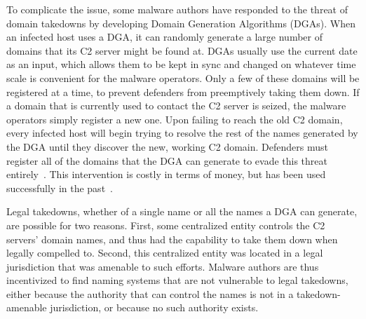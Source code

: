 To complicate the issue, some malware authors have responded to the threat of 
domain 
takedowns by developing Domain Generation Algorithms (DGAs). When an infected 
host uses a DGA, it can randomly generate a large number 
of domains that its C2 server might be found at. DGAs usually use the current 
date as an input, which allows them to be kept in sync and changed on whatever 
time scale is convenient for the malware operators. Only a few of these domains 
will be registered at a time, to prevent defenders from preemptively taking 
them down. If a  
domain that is currently used to contact the C2 server is seized, the malware 
operators simply register a new one. Upon failing to reach the old C2 domain,  
every infected host will begin trying to resolve the rest of the names 
generated by the DGA until they discover the new, working C2 domain. Defenders 
must register all of the domains that the DGA can generate to evade this threat 
entirely~\cite{antonakakis_throw-away_2012}. This intervention is costly in 
terms of money, but has been used successfully in the 
past~\cite{citation_needed}.

Legal takedowns, whether of a single name or all the names a DGA can generate, 
are possible for two reasons. First, some centralized entity controls the C2 
servers' domain names, and thus had the capability to take them down when 
legally compelled to. Second, this centralized entity was located in a legal 
jurisdiction that was amenable to such efforts. Malware 
authors are thus incentivized to find naming systems that are not vulnerable to 
legal takedowns, either because the authority that can control the names is not 
in a takedown-amenable jurisdiction, or because no such authority exists.  


